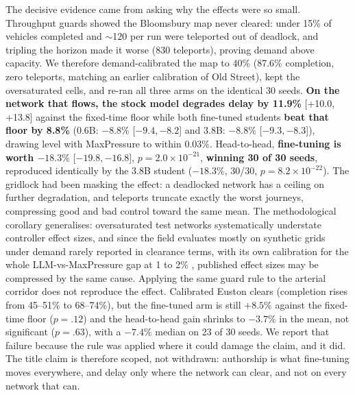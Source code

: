 \documentclass[conference]{IEEEtran}
\begin{document}
The decisive evidence came from asking why the effects were so small.
Throughput guards showed the Bloomsbury map never cleared: under 15\% of
vehicles completed and $\sim$120 per run were teleported out of deadlock,
and tripling the horizon made it worse (830 teleports), proving demand
above capacity. We therefore demand-calibrated the map to 40\% (87.6\%
completion, zero teleports, matching an earlier calibration of Old
Street), kept the oversaturated cells, and re-ran all three arms on the
identical 30 seeds. \textbf{On the network that flows, the stock model
degrades delay by 11.9\%} [+10.0, +13.8] against the fixed-time floor
while both fine-tuned students \textbf{beat that floor by 8.8\%} (0.6B:
$-8.8\%$ [$-9.4, -8.2$] and 3.8B: $-8.8\%$ [$-9.3, -8.3$]), drawing level
with MaxPressure to within $0.03\%$. Head-to-head,
\textbf{fine-tuning is worth $-18.3\%$} [$-19.8, -16.8$],
$p{=}2.0{\times}10^{-21}$, \textbf{winning 30 of 30 seeds}, reproduced
identically by the 3.8B student ($-18.3\%$, 30/30,
$p{=}8.2{\times}10^{-22}$). The gridlock had been masking the
effect: a deadlocked network has a ceiling on further degradation, and
teleports truncate exactly the worst journeys, compressing good and bad
control toward the same mean. The methodological corollary generalises:
oversaturated test networks systematically understate controller effect
sizes, and since the field evaluates mostly on synthetic grids under
demand rarely reported in clearance terms, with its own calibration for
the whole LLM-vs-MaxPressure gap at 1 to 2\% \cite{dglight2026}, published
effect sizes may be compressed by the same cause. Applying the same guard
rule to the arterial corridor does not reproduce the effect. Calibrated
Euston clears (completion rises from 45--51\% to 68--74\%), but the
fine-tuned arm is still $+8.5\%$ against the fixed-time floor
($p{=}.12$) and the head-to-head gain shrinks to $-3.7\%$ in the mean,
not significant ($p{=}.63$), with a $-7.4\%$ median on 23 of 30 seeds. We
report that failure because the rule was applied where it could damage
the claim, and it did. The title claim is
therefore scoped, not withdrawn: authorship is what fine-tuning moves
everywhere, and delay only where the network can clear, and not on every
network that can.
\end{document}
